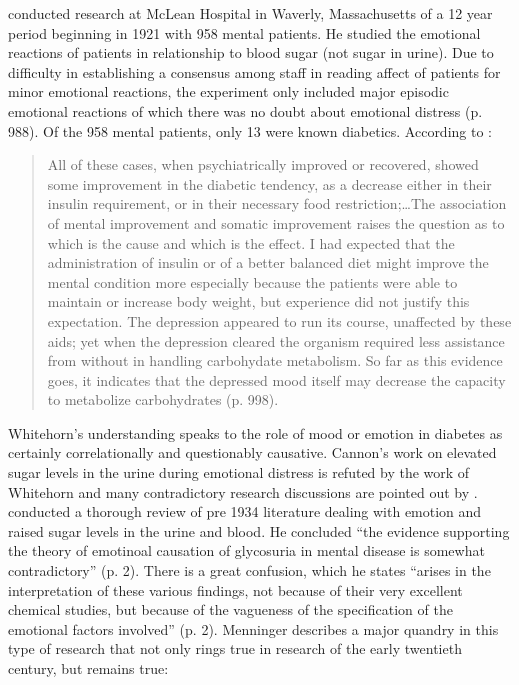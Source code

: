 \documentclass[12pt]{article}
\begin{document}
\citet{whitehorn_blood_1934} conducted research at McLean Hospital in Waverly, Massachusetts of a 12 year period beginning in 1921 with 958 mental patients. He studied the emotional reactions of patients in relationship to blood sugar (not sugar in urine). Due to difficulty in establishing a consensus among staff in reading affect of patients for minor emotional reactions, the experiment only included major episodic emotional reactions of which there was no doubt about emotional distress (p. 988). Of the 958 mental patients, only 13 were known diabetics. According to \citet{whitehorn_blood_1934}:
\begin{singlespace}
  \begin{quote}
  All of these cases, when psychiatrically improved or recovered, showed some improvement in the diabetic tendency, as a decrease either in their insulin requirement, or in their necessary food restriction;\dots The association of mental improvement and somatic improvement raises the question as to which is the cause and which is the effect. I had expected that the administration of insulin or of a better balanced diet might improve the mental condition more especially because the patients were able to maintain or increase body weight, but experience did not justify this expectation. The depression appeared to run its course, unaffected by these aids; yet when the depression cleared the organism required less assistance from without in handling carbohydate metabolism. So far as this evidence goes, it indicates that the depressed mood itself may decrease the capacity to metabolize carbohydrates (p. 998).
    \end{quote} 
\end{singlespace}
Whitehorn's understanding speaks to the role of mood or emotion in diabetes as certainly correlationally and questionably causative. Cannon's work \citep{Cannon_emotional_1911} on elevated sugar levels in the urine during emotional distress is refuted by the work of Whitehorn and many contradictory research discussions are pointed out by \citet{bowman_sugar_1929} \citep{stragnell_1921_relationship, miles_1922_psychologic, masson_1923_mental, neilson_1927_emotional}. 
\citet{menninger_1935_psychological} conducted a thorough review of pre 1934 literature dealing with emotion and raised sugar levels in the urine and blood. He concluded ``the evidence supporting the theory of emotinoal causation of glycosuria in mental disease is somewhat contradictory'' (p. 2). There is a great confusion, which he states ``arises in the interpretation of these various findings, not because of their very excellent chemical studies, but because of the vagueness of the specification of the emotional factors involved'' (p. 2). Menninger describes a major quandry in this type of research that not only rings true in research of the early twentieth century, but remains true: 
\end{document}
